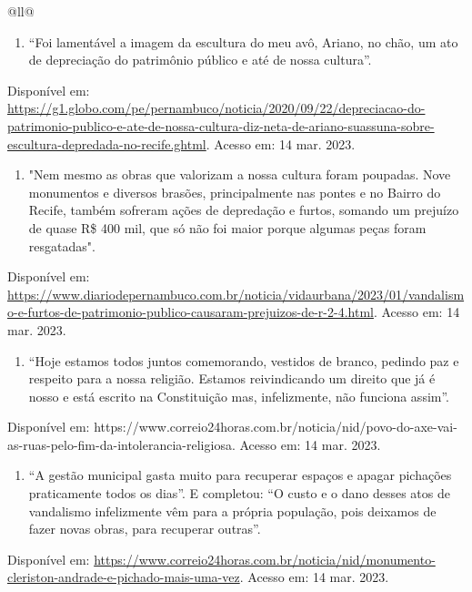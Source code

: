 \begin{itemize}
\begin{itemize}
\begin{escolha}[]{@{}ll@{}}
{{{{{{\begin{enumerate}
\def\labelenumi{\alph{enumi}.}
\item
  ``Foi lamentável a imagem da escultura do meu avô, Ariano, no chão, um
  ato de depreciação do patrimônio público e até de nossa cultura''.
\end{enumerate}

Disponível em:
\url{https://g1.globo.com/pe/pernambuco/noticia/2020/09/22/depreciacao-do-patrimonio-publico-e-ate-de-nossa-cultura-diz-neta-de-ariano-suassuna-sobre-escultura-depredada-no-recife.ghtml}.
Acesso em: 14 mar. 2023.

\begin{enumerate}
\def\labelenumi{\alph{enumi}.}
\item
  "Nem mesmo as obras que valorizam a nossa cultura foram poupadas. Nove
  monumentos e diversos brasões, principalmente nas pontes e no Bairro
  do Recife, também sofreram ações de depredação e furtos, somando um
  prejuízo de quase R\$ 400 mil, que só não foi maior porque algumas
  peças foram resgatadas".
\end{enumerate}

Disponível em:
\url{https://www.diariodepernambuco.com.br/noticia/vidaurbana/2023/01/vandalismo-e-furtos-de-patrimonio-publico-causaram-prejuizos-de-r-2-4.html}.
Acesso em: 14 mar. 2023.

\begin{enumerate}
\def\labelenumi{\alph{enumi}.}
\item
  ``Hoje estamos todos juntos comemorando, vestidos de branco, pedindo
  paz e respeito para a nossa religião. Estamos reivindicando um direito
  que já é nosso e está escrito na Constituição mas, infelizmente, não
  funciona assim''.
\end{enumerate}

Disponível em:
https://www.correio24horas.com.br/noticia/nid/povo-do-axe-vai-as-ruas-pelo-fim-da-intolerancia-religiosa.
Acesso em: 14 mar. 2023.

\begin{enumerate}
\def\labelenumi{\alph{enumi}.}
\item
  ``A gestão municipal gasta muito para recuperar espaços e apagar
  pichações praticamente todos os dias''. E completou: ``O custo e o
  dano desses atos de vandalismo infelizmente vêm para a própria
  população, pois deixamos de fazer novas obras, para recuperar
  outras''.
\end{enumerate}

Disponível em:
\url{https://www.correio24horas.com.br/noticia/nid/monumento-cleriston-andrade-e-pichado-mais-uma-vez}.
Acesso em: 14 mar. 2023.

}}}}}}
\end{escolha}
\end{itemize}
\end{itemize}
